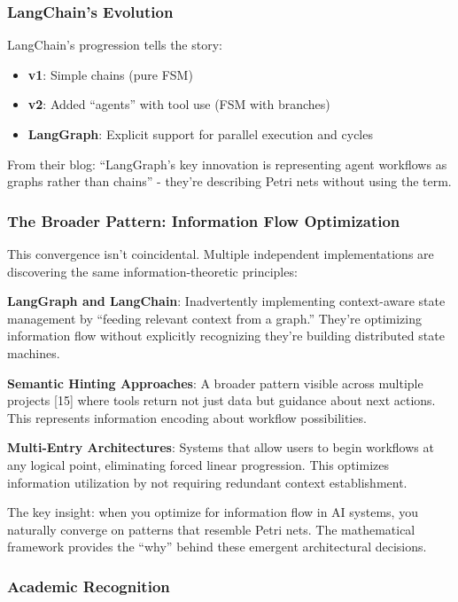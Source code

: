 \documentclass[11pt,a4paper]{article}
\begin{document}
\subsubsection{LangChain's Evolution}

LangChain's progression tells the story:
\begin{itemize}
\item \textbf{v1}: Simple chains (pure FSM)
\item \textbf{v2}: Added ``agents'' with tool use (FSM with branches)
\item \textbf{LangGraph}: Explicit support for parallel execution and cycles
\end{itemize}

From their blog: ``LangGraph's key innovation is representing agent workflows as graphs rather than chains'' - they're describing Petri nets without using the term.

\subsubsection{The Broader Pattern: Information Flow Optimization}

This convergence isn't coincidental. Multiple independent implementations are discovering the same information-theoretic principles:

\textbf{LangGraph and LangChain}: Inadvertently implementing context-aware state management by ``feeding relevant context from a graph.'' They're optimizing information flow without explicitly recognizing they're building distributed state machines.

\textbf{Semantic Hinting Approaches}: A broader pattern visible across multiple projects [15] where tools return not just data but guidance about next actions. This represents information encoding about workflow possibilities.

\textbf{Multi-Entry Architectures}: Systems that allow users to begin workflows at any logical point, eliminating forced linear progression. This optimizes information utilization by not requiring redundant context establishment.

The key insight: when you optimize for information flow in AI systems, you naturally converge on patterns that resemble Petri nets. The mathematical framework provides the ``why'' behind these emergent architectural decisions.

\subsubsection{Academic Recognition}
\end{document}
